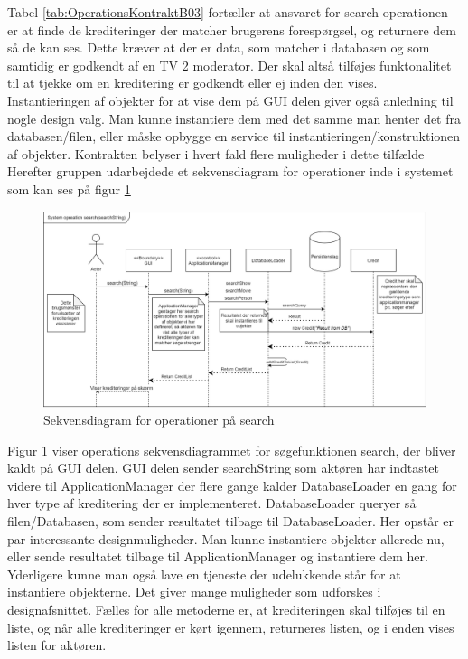 Tabel \ref{tab:OperationsKontraktB03} fortæller at ansvaret for search
operationen er at finde de krediteringer der matcher brugerens forespørgsel, og
returnere dem så de kan ses. Dette kræver at der er data, som matcher i databasen og
som samtidig er godkendt af en TV 2 moderator. Der skal altså tilføjes
funktonalitet til at tjekke om en kreditering er godkendt eller ej inden den
vises. Instantieringen af objekter for at vise dem på GUI delen giver også
anledning til nogle design valg. Man kunne instantiere dem med det samme man
henter det fra databasen/filen, eller måske opbygge en service til
instantieringen/konstruktionen af objekter. Kontrakten belyser i hvert fald
flere muligheder i dette tilfælde
Herefter gruppen udarbejdede et sekvensdiagram for operationer inde i systemet
som kan ses på figur \ref{fig:OperationsSekvensdiagramSearch} 
\begin{figure}[H]
\centerline{\includegraphics[scale = 0.33]{images/B03OSD.png}}
    \caption{Sekvensdiagram for operationer på search}
    \label{fig:OperationsSekvensdiagramSearch}
\end{figure}

Figur \ref{fig:OperationsSekvensdiagramSearch} viser operations sekvensdiagrammet for søgefunktionen search, der bliver kaldt på GUI delen. GUI delen sender searchString som aktøren har indtastet videre til ApplicationManager der flere gange kalder DatabaseLoader en gang for hver type af kreditering der er implementeret. DatabaseLoader queryer så filen/Databasen, som sender resultatet tilbage til DatabaseLoader. Her opstår er par interessante designmuligheder. Man kunne instantiere objekter allerede nu, eller sende resultatet tilbage til ApplicationManager og instantiere dem her. Yderligere kunne man også lave en tjeneste der udelukkende står for at instantiere objekterne. Det giver mange muligheder som udforskes i designafsnittet. Fælles for alle metoderne er, at krediteringen skal tilføjes til en liste, og når alle krediteringer er kørt igennem, returneres listen, og i enden vises listen for aktøren.

